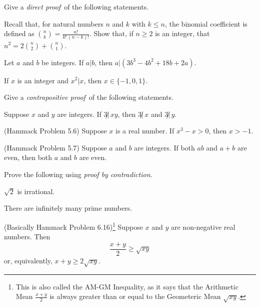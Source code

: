 
%


%
\thispagestyle{fancy}

\begin{enumerate}
  \Problem Give a \emph{direct proof}\ of the following statements.
  \begin{enumerate}
    \Part  Recall that, for natural numbers $n$ and $k$ with $k\le n$,
    the binomial coefficient is defined as $\binom{n}{k} =
    \frac{n!}{k!\,(n-k)!}$.  Show that, if $n\ge2$ is an integer, that
    $n^2 = 2\binom{n}{2} + \binom{n}{1}$.
    \vfill

    \Part Let $a$ and $b$ be integers. If $a|b$, then
    $a|\left(3b^3-4b^2+18b+2a\right)$.  \vfill

    \Part If $x$ is an integer and $x^2|x$, then $x\in
    \{-1,0,1\}$. 
    \vfill

  \end{enumerate}

  \Problem Give a \emph{contrapositive proof}\ of the following statements. 
  \begin{enumerate}
    \Part Suppose $x$ and $y$ are integers.  If $3\not|\,xy$,
    then $3\not|\,x$ and $3\not|\,y$.
    \vfill

    \Part (Hammack Problem 5.6) Suppose $x$ is a real number.  If $x^3
    -x > 0$, then $x>-1$.
    \vfill

    \Part (Hammack Problem 5.7) Suppose $a$ and $b$ are integers.  If
    both $ab$ and $a+b$ are even, then both $a$ and $b$ are even.
    \vfill
  \end{enumerate}

\end{enumerate}
\newpage

Prove the following using \emph{proof by contradiction}.
\begin{enumerate}
  \Problem $\sqrt{2}$ is irrational.
  \vfill

  \Problem There are infinitely many prime numbers.
  \vfill


  \Problem (Basically Hammack Problem 6.16)\footnote{%
    This is also called the AM-GM Inequality, as it says that the
    Arithmetic Mean $\frac{x+y}{2}$ is always greater than or equal to
    the Geometeric Mean $\sqrt{xy}$.}   %
  Suppose $x$ and $y$ are non-negative real numbers.  Then
  \begin{equation*}
    \frac{x+y}{2} \ge \sqrt{xy}
  \end{equation*}
  or, equivalently, $x+y\ge 2\sqrt{xy}$.  
  \vfill
\end{enumerate}

